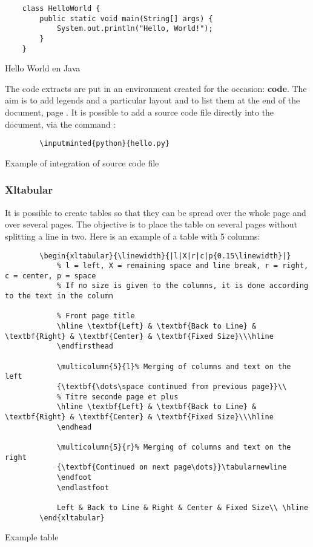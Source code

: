 \begin{code}
    \begin{verbatim}
    class HelloWorld {
        public static void main(String[] args) {
            System.out.println("Hello, World!");
        }
    }
\end{verbatim}
    \caption{Hello World en Java}
\end{code}

The code extracts are put in an environment created for the occasion: \textbf{code}.
The aim is to add legends and a particular layout and to list them at the end of the document,
page \pageref{TableOfCode}.
It is possible to add a source code file directly into the document, via the command :
\begin{code}
    \begin{verbatim}
        \inputminted{python}{hello.py}
\end{verbatim}
    \caption{Example of integration of source code file}
\end{code}

\subsubsection{Xltabular}
It is possible to create tables so that they can be spread over the whole page and over several pages.
The objective is to place the table on several pages without splitting a line in two.
Here is an example of a table with 5 columns:
\begin{code}
    \begin{verbatim}
        \begin{xltabular}{\linewidth}{|l|X|r|c|p{0.15\linewidth}|}
            % l = left, X = remaining space and line break, r = right, c = center, p = space
            % If no size is given to the columns, it is done according to the text in the column

            % Front page title
            \hline \textbf{Left} & \textbf{Back to Line} & \textbf{Right} & \textbf{Center} & \textbf{Fixed Size}\\\hline
            \endfirsthead

            \multicolumn{5}{l}% Merging of columns and text on the left
            {\textbf{\dots\space continued from previous page}}\\
            % Titre seconde page et plus
            \hline \textbf{Left} & \textbf{Back to Line} & \textbf{Right} & \textbf{Center} & \textbf{Fixed Size}\\\hline
            \endhead

            \multicolumn{5}{r}% Merging of columns and text on the right
            {\textbf{Continued on next page\dots}}\tabularnewline
            \endfoot
            \endlastfoot

            Left & Back to Line & Right & Center & Fixed Size\\ \hline
        \end{xltabular}
\end{verbatim}
    \caption{Example table}
\end{code}


